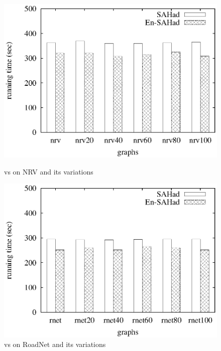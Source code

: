 \begin{figure}[htbp]
\hfill
\begin{minipage}[t]{0.45\linewidth}
\begin{center}
\centerline{\includegraphics[scale=0.35]{plots/enhanced-sahad-sorting-nrv.eps}}
\caption{\sahad{} vs \ensahad{} on NRV and its variations}
\label{fig:enhanced-sahad-sorting-nrv}
\end{center}
\end{minipage}
\hfill
\begin{minipage}[t]{0.45\linewidth}
\begin{center}
\centerline{\includegraphics[scale=0.35]{plots/enhanced-sahad-sorting-rnet.eps}}
\caption{\sahad{} vs \ensahad{} on RoadNet and its variations}
\label{fig:enhanced-sahad-sorting-rnet}
\end{center}
\end{minipage}
\hfill
\end{figure}

